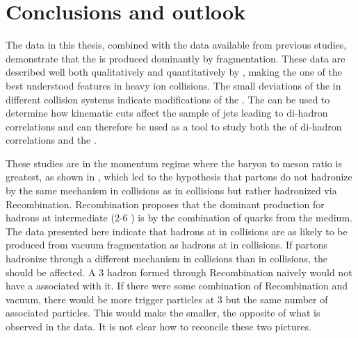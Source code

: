 \chapter{Conclusions and outlook\label{conclusions}}
The data in this thesis, combined with the data available from previous studies, demonstrate that the \jlc is produced dominantly by fragmentation.  These data are described well both qualitatively and quantitatively by \py, making the \jlc one of the best understood features in heavy ion collisions.  The small deviations of the \jlc in different collision systems indicate modifications of the \jlc.  The \jlc can be used to determine how kinematic cuts affect the sample of jets leading to di-hadron correlations and can therefore be used as a tool to study both the \as of di-hadron correlations and the \ridge.

These studies are in the momentum regime where the baryon to meson ratio is greatest, as shown in , which led to the hypothesis that partons do not hadronize by the same mechanism in \AplusA collisions as in \pp collisions but rather hadronized via Recombination.  Recombination proposes that the dominant production for hadrons at intermediate \pT (2-6 \GeV) is by the combination of quarks from the medium.  The data presented here indicate that hadrons at \pT {} \GeV in \AplusA collisions are as likely to be produced from vacuum fragmentation as hadrons at \pT {} \GeV in \pp collisions.  If partons hadronize through a different mechanism in \AplusA collisions than in \pp collisions, the \jlc should be affected.  A 3 \GeV hadron formed through Recombination naively would not have a \jlc associated with it.  If there were some combination of Recombination and vacuum, there would be more trigger particles at 3 \GeV but the same number of associated particles.  This would make the \jly smaller, the opposite of what is observed in the data.  It is not clear how to reconcile these two pictures.


